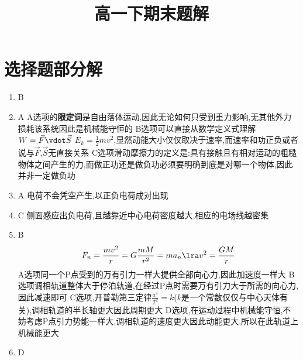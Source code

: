 

\title{高一下期末题解}
\author{}


    \maketitle
    \tableofcontents
    \newpage


    \section{选择题部分解}

        \begin{enumerate}
            \item B 
            \item A     \newline
            A选项的\textbf{限定词}是自由落体运动,因此无论如何只受到重力影响,无其他外力损耗该系统因此是机械能守恒的   \newline 
            B选项可以直接从数学定义式理解$ W = \vec{F} \vdot \vec{S} $ \quad $ E_{k} = \frac{1}{2} m v^{2} $,显然动能大小仅仅取决于速率,而速率和功正负或者说与$\vec{F}$,$\vec{S}$无直接关系     \newline
            C选项滑动摩擦力的定义是:具有接触且有相对运动的粗糙物体之间产生的力,而做正功还是做负功必须要明确到底是对哪一个物体,因此并非一定做负功
            \item A     \newline
            电荷不会凭空产生,以正负电荷成对出现
            \item C     \newline 
            侧面感应出负电荷,且越靠近中心电荷密度越大,相应的电场线越密集
            \item B     
            $$
            F_{n} = \frac{m v^{2}}{r} = G\frac{mM}{r^{2}} = m a_{n} \lra v^{2} = \frac{GM}{r}
            $$
            A选项同一个P点受到的万有引力一样大提供全部向心力,因此加速度一样大   \newline
            B选项调相轨道整体大于停泊轨道,在经过P点时需要万有引力大于所需的向心力,因此减速即可  \newline
            C选项,开普勒第三定律$ \frac{a^{3}}{T^{2}} = k $($k$是一个常数仅仅与中心天体有关),调相轨道的半长轴更大因此周期更大   \newline
            D选项,在运动过程中机械能守恒,不妨考虑P点引力势能一样大,调相轨道的速度更大因此动能更大,所以在此轨道上机械能更大
            \item D     \newline

\end{enumerate}
